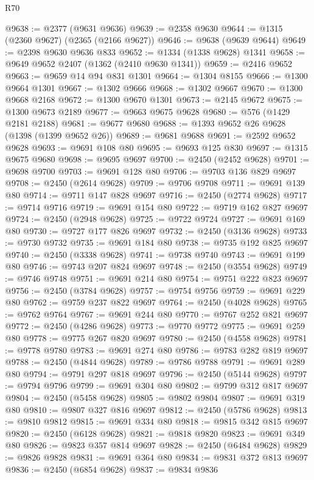 \begin{lexlean}{R70}
\begin{coremodule}
@9638 := @2377 (@9631 @9636)
@9639 := @2358 @9630
@9644 := @1315 (@2360 @9627) (@2365 (@2166 @9627))
@9646 := @9638 (@9639 @9644)
@9649 := @2398 @9630 @9636 @833
@9652 := @1334 (@1338 @9628) @1341
@9658 := @9649 @9652 @2407 (@1362 (@2410 @9630 @1341))
@9659 := @2416 @9652
@9663 := @9659 @14 @94 @831 @1301
@9664 := @1304 @8155
@9666 := @1300 @9664 @1301
@9667 := @1302 @9666
@9668 := @1302 @9667
@9670 := @1300 @9668 @2168
@9672 := @1300 @9670 @1301
@9673 := @2145 @9672
@9675 := @1300 @9673 @2189
@9677 := @9663 @9675 @9628
@9680 := @576 (@1429 @2181 @2188)
@9681 := @9677 @9680
@9688 := @1393 @9652 @26 @9628 (@1398 (@1399 @9652 @26))
@9689 := @9681 @9688
@9691 := @2592 @9652 @9628
@9693 := @9691 @108 @80
@9695 := @9693 @125 @830
@9697 := @1315 @9675 @9680
@9698 := @9695 @9697
@9700 := @2450 (@2452 @9628)
@9701 := @9698 @9700
@9703 := @9691 @128 @80
@9706 := @9703 @136 @829 @9697
@9708 := @2450 (@2614 @9628)
@9709 := @9706 @9708
@9711 := @9691 @139 @80
@9714 := @9711 @147 @828 @9697
@9716 := @2450 (@2774 @9628)
@9717 := @9714 @9716
@9719 := @9691 @154 @80
@9722 := @9719 @162 @827 @9697
@9724 := @2450 (@2948 @9628)
@9725 := @9722 @9724
@9727 := @9691 @169 @80
@9730 := @9727 @177 @826 @9697
@9732 := @2450 (@3136 @9628)
@9733 := @9730 @9732
@9735 := @9691 @184 @80
@9738 := @9735 @192 @825 @9697
@9740 := @2450 (@3338 @9628)
@9741 := @9738 @9740
@9743 := @9691 @199 @80
@9746 := @9743 @207 @824 @9697
@9748 := @2450 (@3554 @9628)
@9749 := @9746 @9748
@9751 := @9691 @214 @80
@9754 := @9751 @222 @823 @9697
@9756 := @2450 (@3784 @9628)
@9757 := @9754 @9756
@9759 := @9691 @229 @80
@9762 := @9759 @237 @822 @9697
@9764 := @2450 (@4028 @9628)
@9765 := @9762 @9764
@9767 := @9691 @244 @80
@9770 := @9767 @252 @821 @9697
@9772 := @2450 (@4286 @9628)
@9773 := @9770 @9772
@9775 := @9691 @259 @80
@9778 := @9775 @267 @820 @9697
@9780 := @2450 (@4558 @9628)
@9781 := @9778 @9780
@9783 := @9691 @274 @80
@9786 := @9783 @282 @819 @9697
@9788 := @2450 (@4844 @9628)
@9789 := @9786 @9788
@9791 := @9691 @289 @80
@9794 := @9791 @297 @818 @9697
@9796 := @2450 (@5144 @9628)
@9797 := @9794 @9796
@9799 := @9691 @304 @80
@9802 := @9799 @312 @817 @9697
@9804 := @2450 (@5458 @9628)
@9805 := @9802 @9804
@9807 := @9691 @319 @80
@9810 := @9807 @327 @816 @9697
@9812 := @2450 (@5786 @9628)
@9813 := @9810 @9812
@9815 := @9691 @334 @80
@9818 := @9815 @342 @815 @9697
@9820 := @2450 (@6128 @9628)
@9821 := @9818 @9820
@9823 := @9691 @349 @80
@9826 := @9823 @357 @814 @9697
@9828 := @2450 (@6484 @9628)
@9829 := @9826 @9828
@9831 := @9691 @364 @80
@9834 := @9831 @372 @813 @9697
@9836 := @2450 (@6854 @9628)
@9837 := @9834 @9836

\end{coremodule}
\end{lexlean}
